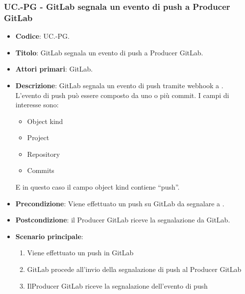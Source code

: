 \subsubsection{UC\theuccount.\thesubuccount-PG - GitLab segnala un evento di push a Producer GitLab}
\begin{itemize}
\item \textbf{Codice}: UC\theuccount.\thesubuccount-PG.
\item \textbf{Titolo}: GitLab segnala un evento di push a Producer GitLab.
\item \textbf{Attori primari}: GitLab.
\item \textbf{Descrizione}: GitLab segnala un evento di push tramite webhook a \progetto. L'evento di	push può essere composto da uno o più commit.
I campi di interesse sono:
\begin{itemize}
    \item Object kind
    \item Project
    \item Repository
    \item Commits
\end{itemize}
E in questo caso il campo object kind contiene ``push''.
\item \textbf{Precondizione}: Viene effettuato un push su GitLab da segnalare a \progetto.
\item \textbf{Postcondizione}: il Producer GitLab riceve la segnalazione da GitLab.
\item \textbf{Scenario principale}:
\begin{enumerate}
    \item Viene effettuato un push in GitLab
    \item GitLab procede all'invio della segnalazione di push al Producer GitLab
    \item IlProducer GitLab riceve la segnalazione dell'evento di push
\end{enumerate}

\end{itemize}


